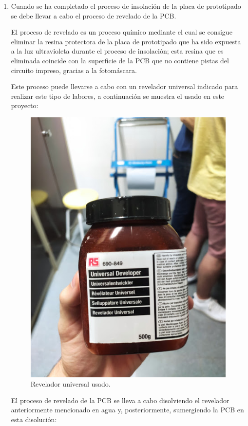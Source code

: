 \begin{enumerate}
    \item Cuando se ha completado el proceso de insolación de la placa de prototipado se debe llevar a cabo el proceso de revelado de la \ac{PCB}.
    
    El proceso de revelado es un proceso químico mediante el cual se consigue eliminar la resina protectora de la placa de prototipado que ha sido expuesta a la luz ultravioleta durante el proceso de insolación; esta resina que es eliminada coincide con la superficie de la \ac{PCB} que no contiene pistas del circuito impreso, gracias a la fotomáscara.
    
    Este proceso puede llevarse a cabo con un revelador universal indicado para realizar este tipo de labores, a continuación se muestra el usado en este proyecto:
    
    \begin{figure}[H]
    \centering 
    \includegraphics[width=0.6\linewidth]{pictures/Revelador.jpg}
    \caption{Revelador universal usado.}
    \end{figure}
    
    El proceso de revelado de la \ac{PCB} se lleva a cabo disolviendo el revelador anteriormente mencionado en agua y, posteriormente, sumergiendo la \ac{PCB} en esta disolución:
    

\end{enumerate}
